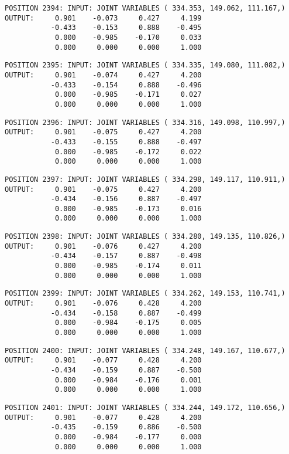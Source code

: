 \begin{verbatim}
POSITION 2394: INPUT: JOINT VARIABLES ( 334.353, 149.062, 111.167,)
OUTPUT:     0.901    -0.073     0.427     4.199
           -0.433    -0.153     0.888    -0.495
            0.000    -0.985    -0.170     0.033
            0.000     0.000     0.000     1.000
\end{verbatim} \pagebreak[1]\begin{verbatim}
POSITION 2395: INPUT: JOINT VARIABLES ( 334.335, 149.080, 111.082,)
OUTPUT:     0.901    -0.074     0.427     4.200
           -0.433    -0.154     0.888    -0.496
            0.000    -0.985    -0.171     0.027
            0.000     0.000     0.000     1.000
\end{verbatim} \pagebreak[1]\begin{verbatim}
POSITION 2396: INPUT: JOINT VARIABLES ( 334.316, 149.098, 110.997,)
OUTPUT:     0.901    -0.075     0.427     4.200
           -0.433    -0.155     0.888    -0.497
            0.000    -0.985    -0.172     0.022
            0.000     0.000     0.000     1.000
\end{verbatim} \pagebreak[1]\begin{verbatim}
POSITION 2397: INPUT: JOINT VARIABLES ( 334.298, 149.117, 110.911,)
OUTPUT:     0.901    -0.075     0.427     4.200
           -0.434    -0.156     0.887    -0.497
            0.000    -0.985    -0.173     0.016
            0.000     0.000     0.000     1.000
\end{verbatim} \pagebreak[1]\begin{verbatim}
POSITION 2398: INPUT: JOINT VARIABLES ( 334.280, 149.135, 110.826,)
OUTPUT:     0.901    -0.076     0.427     4.200
           -0.434    -0.157     0.887    -0.498
            0.000    -0.985    -0.174     0.011
            0.000     0.000     0.000     1.000
\end{verbatim} \pagebreak[1]\begin{verbatim}
POSITION 2399: INPUT: JOINT VARIABLES ( 334.262, 149.153, 110.741,)
OUTPUT:     0.901    -0.076     0.428     4.200
           -0.434    -0.158     0.887    -0.499
            0.000    -0.984    -0.175     0.005
            0.000     0.000     0.000     1.000
\end{verbatim} \pagebreak[1]\begin{verbatim}
POSITION 2400: INPUT: JOINT VARIABLES ( 334.248, 149.167, 110.677,)
OUTPUT:     0.901    -0.077     0.428     4.200
           -0.434    -0.159     0.887    -0.500
            0.000    -0.984    -0.176     0.001
            0.000     0.000     0.000     1.000
\end{verbatim} \pagebreak[1]\begin{verbatim}
POSITION 2401: INPUT: JOINT VARIABLES ( 334.244, 149.172, 110.656,)
OUTPUT:     0.901    -0.077     0.428     4.200
           -0.435    -0.159     0.886    -0.500
            0.000    -0.984    -0.177     0.000
            0.000     0.000     0.000     1.000
\end{verbatim} \pagebreak[1]
